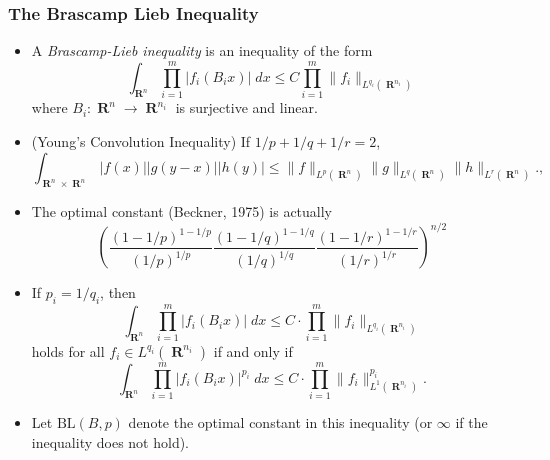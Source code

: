 \documentclass[usenames,dvipsnames,12pt]{beamer}
\DeclareMathOperator{\RR}{\mathbf{R}}
\begin{document}
\begin{frame}

\frametitle{The Brascamp Lieb Inequality}

\begin{itemize}
    \item A \emph{Brascamp-Lieb inequality} is an inequality of the form
    \[ \int_{\RR^n} \prod_{i = 1}^m |f_i(B_i x)|\; dx \leq C \prod_{i = 1}^m \| f_i \|_{L^{q_i}(\RR^{n_i})} \]
    where $B_i: \RR^n \to \RR^{n_i}$ is surjective and linear.



    \item (Young's Convolution Inequality) If $1/p + 1/q + 1/r = 2$,
    \[ \int_{\RR^n \times \RR^n} |f(x)| |g(y-x)| |h(y)| \leq \| f \|_{L^p(\RR^n)} \| g \|_{L^q(\RR^n)} \| h \|_{L^r(\RR^n)}., \]
    
    \pause
    \item The optimal constant (Beckner, 1975) is actually
    \[ \left( \frac{(1-1/p)^{1-1/p}}{(1/p)^{1/p}} \frac{(1-1/q)^{1-1/q}}{(1/q)^{1/q}} \frac{(1-1/r)^{1-1/r}}{(1/r)^{1/r}} \right)^{n/2} \]
\end{itemize}

\end{frame}




\begin{frame}

\begin{itemize}
    \item If $p_i = 1/q_i$, then
    \[ \int_{\RR^n} \prod_{i = 1}^m |f_i(B_i x)|\; dx \leq C \cdot \prod_{i = 1}^m \| f_i \|_{L^{q_i}(\RR^{n_i})} \]
    holds for all $f_i \in L^{q_i}(\RR^{n_i})$ if and only if
    \[ \int_{\RR^n} \prod_{i = 1}^m |f_i(B_i x)|^{p_i}\; dx \leq C \cdot \prod_{i=1}^m \| f_i \|_{L^1(\RR^{n_i})}^{p_i}.  \]

    \pause
    \item Let $\text{BL}(B,p)$ denote the optimal constant in this inequality (or $\infty$ if the inequality does not hold).
\end{itemize}

\end{frame}
\end{document}
